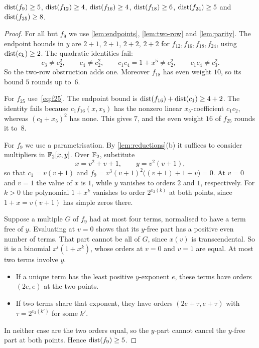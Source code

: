 \begin{lemma}\label{lem:cores}
$\operatorname{dist}(f_9)\ge5$, $\operatorname{dist}(f_{12})\ge4$, $\operatorname{dist}(f_{16})\ge4$, $\operatorname{dist}(f_{18})\ge6$, $\operatorname{dist}(f_{24})\ge5$ and $\operatorname{dist}(f_{25})\ge8$.
\end{lemma}

\begin{proof}
For all but $f_9$ we use \cref{lem:endpoints}, \cref{lem:two-row} and \cref{lem:parity}. The endpoint bounds in $y$ are $2+1$, $2+1$, $2+2$, $2+2$ for $f_{12},f_{16},f_{18},f_{24}$, using $\operatorname{dist}(c_k)\ge2$. The quadratic identities fail:
\[
 c_3\ne c_2^2,\qquad c_4\ne c_2^2,\qquad c_1c_4=1+x^5\ne c_2^2,\qquad c_1c_4\ne c_3^2 .
\]
So the two-row obstruction adds one. Moreover $f_{18}$ has even weight $10$, so its bound $5$ rounds up to~$6$.

For $f_{25}$ use~\eqref{eq:f25}. The endpoint bound is $\operatorname{dist}(f_{16})+\operatorname{dist}(c_1)\ge4+2$. The identity fails because $c_1f_{16}(x,x_5)$ has the nonzero linear $x_5$-coefficient $c_1c_2$, whereas $(c_3+x_5)^2$ has none. This gives $7$, and the even weight $16$ of $f_{25}$ rounds it to~$8$.

For $f_9$ we use a parametrisation. By \cref{lem:reductions}(b) it suffices to consider multipliers in $\mathbb{F}_2[x,y]$. Over $\mathbb{F}_2$, substitute
\[
 x=v^2+v+1,\qquad y=v^2(v+1),
\]
so that $c_1=v(v+1)$ and $f_9=v^3(v+1)^2\bigl((v+1)+1+v\bigr)=0$. At $v=0$ and $v=1$ the value of $x$ is $1$, while $y$ vanishes to orders $2$ and $1$, respectively. For $k>0$ the polynomial $1+x^k$ vanishes to order $2^{v_2(k)}$ at both points, since $1+x=v(v+1)$ has simple zeros there.

Suppose a multiple $G$ of $f_9$ had at most four terms, normalised to have a term free of $y$. Evaluating at $v=0$ shows that its $y$-free part has a positive even number of terms. That part cannot be all of $G$, since $x(v)$ is transcendental. So it is a binomial $x^i(1+x^k)$, whose orders at $v=0$ and $v=1$ are equal. At most two terms involve $y$.
\begin{itemize}
\item If a unique term has the least positive $y$-exponent $e$, these terms have orders $(2e,e)$ at the two points.
\item If two terms share that exponent, they have orders $(2e+\tau,e+\tau)$ with $\tau=2^{v_2(k')}$ for some $k'$.
\end{itemize}
In neither case are the two orders equal, so the $y$-part cannot cancel the $y$-free part at both points. Hence $\operatorname{dist}(f_9)\ge5$.
\end{proof}

